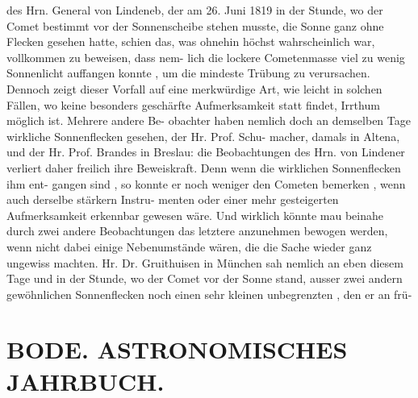 \documentclass[12pt,a4paper]{article}
\begin{document}
{{{{{{{{des  Hrn.  General  von  Lindeneb,  der  am  26.  Juni  1819  in  der Stunde,  wo  der  Comet  bestimmt  vor  der  Sonnenscheibe  stehen  musste,  die  Sonne  ganz  ohne  Flecken gesehen  hatte,  schien  das,  was  ohnehin  höchst  wahrscheinlich  war,  vollkommen  zu  beweisen,  dass  nem- lich  die  lockere  Cometenmasse  viel  zu  wenig  Sonnenlicht  auffangen  konnte ,  um  die  mindeste  Trübung zu  verursachen.  Dennoch  zeigt  dieser  Vorfall  auf  eine  merkwürdige  Art,  wie  leicht  in  solchen  Fällen, wo  keine  besonders  geschärfte  Aufmerksamkeit  statt  findet,  Irrthum  möglich  ist.  Mehrere  andere  Be- obachter haben  nemlich  doch  an  demselben  Tage  wirkliche  Sonnenflecken  gesehen,  der  Hr.  Prof.  Schu- macher, damals  in  Altena,  und  der  Hr.  Prof.  Brandes  in  Breslau:  die  Beobachtungen  des  Hrn.  von Lindener  verliert  daher  freilich  ihre  Beweiskraft.  Denn  wenn  die  wirklichen  Sonnenflecken  ihm  ent- gangen sind ,  so  konnte  er  noch  weniger  den  Cometen  bemerken  ,  wenn  auch  derselbe  stärkern  Instru- menten oder  einer  mehr  gesteigerten  Aufmerksamkeit  erkennbar  gewesen  wäre.  Und  wirklich  könnte mau  beinahe  durch  zwei  andere  Beobachtungen  das  letztere  anzunehmen  bewogen  werden,  wenn  nicht dabei  einige  Nebenumstände  wären,  die  die  Sache  wieder  ganz  ungewiss  machten.  Hr.  Dr.  Gruithuisen in  München  sah  nemlich  an  eben  diesem  Tage  und  in  der  Stunde,  wo  der  Comet  vor  der  Sonne  stand, ausser  zwei  andern  gewöhnlichen  Sonnenflecken  noch  einen  sehr  kleinen  unbegrenzten ,   den   er    an   frü-


\section*{BODE.      ASTRONOMISCHES  JAHRBUCH.}

}}}}}}}}
\end{document}
